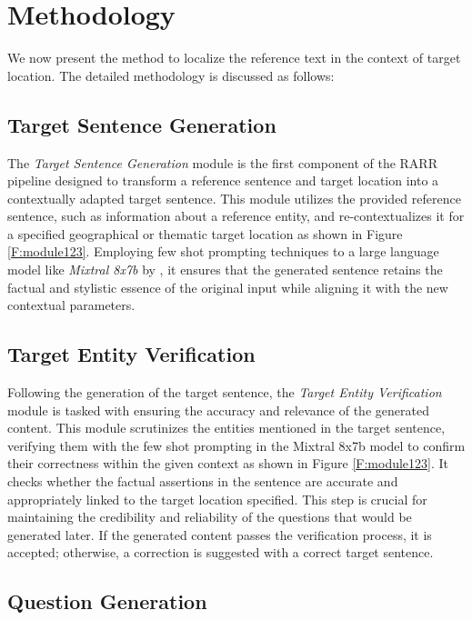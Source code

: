 \documentclass[11pt]{article}
\begin{document}
	\section{Methodology}
	We now present the method to localize the reference text in the context of target location. The detailed methodology is discussed as follows:
	
	\subsection{Target Sentence Generation}
	
	The \emph{Target Sentence Generation} module is the first component of the RARR pipeline designed to transform a reference sentence and target location into a contextually adapted target sentence. This module utilizes the provided reference sentence, such as information about a reference entity, and re-contextualizes it for a specified geographical or thematic target location as shown in Figure \ref{F:module123}. Employing few shot prompting techniques to a large language model like \emph{Mixtral 8x7b} by \cite{jiang2024mixtral}, it ensures that the generated sentence retains the factual and stylistic essence of the original input while aligning it with the new contextual parameters. 
	
	\subsection{Target Entity Verification}
	
	Following the generation of the target sentence, the \emph{Target Entity Verification} module is tasked with ensuring the accuracy and relevance of the generated content. This module scrutinizes the entities mentioned in the target sentence, verifying them with the few shot prompting in the Mixtral 8x7b model to confirm their correctness within the given context as shown in Figure \ref{F:module123}. It checks whether the factual assertions in the sentence are accurate and appropriately linked to the target location specified. This step is crucial for maintaining the credibility and reliability of the questions that would be generated later. If the generated content passes the verification process, it is accepted; otherwise, a correction is suggested with a correct target sentence.
	
	\subsection{Question Generation}
	
\end{document}
